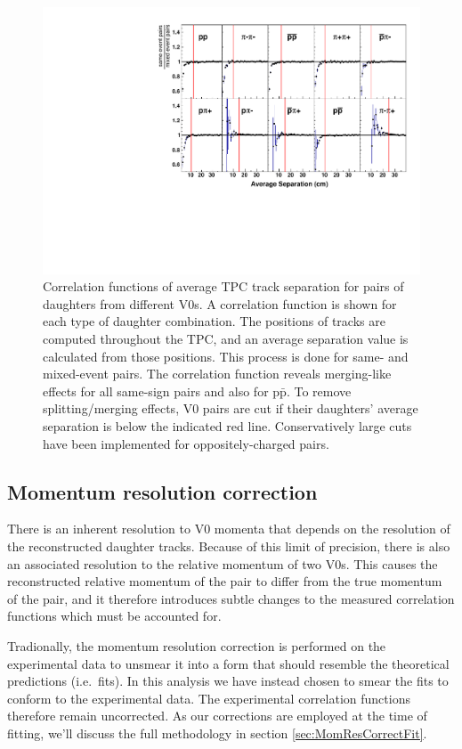 \begin{figure}[hbtp]
\includegraphics[width=36pc]{Figures/Cuts/2016-9-4-AllAvgSepCFs.pdf}
\caption[Average separation of V0 daughters]{
Correlation functions of average TPC track separation for pairs of daughters from different V0s. A correlation function is shown for each type of daughter combination. The positions of tracks are computed throughout the TPC, and an average separation value is calculated from those positions. This process is done for same- and mixed-event pairs. The correlation function reveals merging-like effects for all same-sign pairs and also for p$\bar{\mathrm{p}}$. To remove splitting/merging effects, V0 pairs are cut if  their daughters' average separation is below the indicated red line. Conservatively large cuts have been implemented for oppositely-charged pairs.}
\label{fig:AverageSeparationAllPairs}
\end{figure}

\subsection{Momentum resolution correction}
\label{sec:MomentumResCorrectionCF}

There is an inherent resolution to V0 momenta that depends on the resolution of the reconstructed daughter tracks.  
Because of this limit of precision, there is also an associated resolution to the relative momentum of two V0s.
This causes the reconstructed relative momentum of the pair to differ from the true momentum of the pair, and it therefore introduces subtle changes to the measured correlation functions which must be accounted for.

Tradionally, the momentum resolution correction is performed on the experimental data to unsmear it into a form that should resemble the theoretical predictions (i.e.\ fits). 
In this analysis we have instead chosen to smear the fits to conform to the experimental data. 
The experimental correlation functions therefore remain uncorrected. 
As our corrections are employed at the time of fitting, we'll discuss the full methodology in section \ref{sec:MomResCorrectFit}.